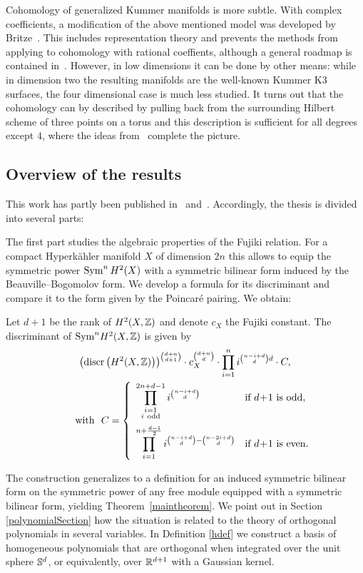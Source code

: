 Cohomology of generalized Kummer manifolds is more subtle. With complex coefficients, a modification of the above mentioned model was developed by Britze~\cite{Britze}. This includes representation theory and prevents the methods from applying to cohomology with rational coeffients, although a general roadmap is contained in~\cite{Twisted}.
However, in low dimensions it can be done by other means: while in dimension two the resulting manifolds are the well-known Kummer K3 surfaces, the four dimensional case is much less studied. It turns out that the cohomology can by described by pulling back from the surrounding Hilbert scheme of three points on a torus and this description is sufficient for all degrees except $4$, where the ideas from~\cite{Hassett} complete the picture.

\subsection{Overview of the results}
This work has partly been published in~\cite{Kapfer2} and~\cite{Kapfer}. 
Accordingly, the thesis is divided into several parts:

The first part \cite{Kapfer} studies the algebraic properties of the Fujiki relation. For a compact Hyperk\"ahler manifold $X$ of dimension $2n$ this allows to equip the symmetric power $\Sym^nH^2(X)$ with a symmetric bilinear form induced by the Beauville--Bogomolov form. We develop a formula for its discriminant and compare it to the form given by the Poincar\'e pairing.
We obtain:
{
\renewcommand{\thetheorem}{\ref{FujikiDiscr}}
\begin{theorem}
Let $d+1$ be the rank of $H^2(X,\Z)$ and denote $c_X$ the Fujiki constant.
The discriminant of $\Sym^n\!H^2(X,\Z)$ is given by
\begin{gather*}
\left(\discr \left(H^2(X,\Z)\right)\right)^{\binom{d+n}{d+1}}\cdot c_X^{\binom{d+n}{d}} \cdot \prod_{i=1}^n i^{\binom{n-i+d}{d}d} 
\cdot C, \\
\qquad \text{with } \ 
C=
\left\{
 \begin{array}{*2{l}p{5cm}}
 \displaystyle\prod_{\substack{i=1 \\ i\ \text{odd}\\\ }}^{2n+d-1}i^{\binom{n-i+d}{d}} &\text{if }d\!+\! 1\text{ is odd}, \\
 \displaystyle\prod_{i=1}^{n+\frac{d-1}{2}} i^{\binom{n-i+d}{d} - \binom{n-2i+d}{d}} &\text{if }d\! +\! 1\text{ is even}.
\end{array}
\right.
\end{gather*}
\end{theorem}
\addtocounter{theorem}{-1}
}
The construction generalizes to a definition for an induced symmetric bilinear form on the symmetric power of any free module equipped with a symmetric bilinear form, yielding Theorem~\ref{maintheorem}. We point out in Section \ref{polynomialSection} how the situation is related to the theory of orthogonal polynomials in several variables.
In Definition \ref{hdef} we construct a basis of homogeneous polynomials that are orthogonal when integrated over the unit sphere $\S^d$, or equivalently, over $\R^{d+1}$ with a Gaussian kernel.

